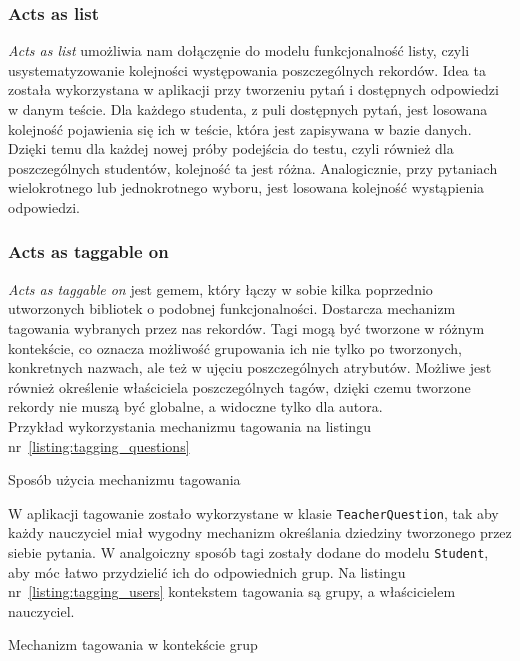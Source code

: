 \documentclass[a4paper,12pt]{article}
\begin{document}
\subsubsection{Acts as list}
\emph{Acts as list} umożliwia nam dołączęnie do modelu funkcjonalność listy, czyli
usystematyzowanie kolejności występowania poszczególnych rekordów. Idea ta została
wykorzystana w aplikacji przy tworzeniu pytań i dostępnych odpowiedzi w danym teście.
Dla każdego studenta, z puli dostępnych pytań, jest losowana kolejność pojawienia się ich w
teście, która jest zapisywana w bazie danych. Dzięki temu dla każdej nowej próby podejścia
do testu, czyli również dla poszczególnych studentów, kolejność ta jest różna.
Analogicznie, przy pytaniach wielokrotnego lub jednokrotnego wyboru, jest losowana
kolejność wystąpienia odpowiedzi.

\subsubsection{Acts as taggable on}
\emph{Acts as taggable on} jest gemem, który łączy w sobie kilka poprzednio utworzonych
bibliotek o podobnej funkcjonalności. Dostarcza mechanizm tagowania wybranych przez
nas rekordów. Tagi mogą być tworzone w różnym kontekście, co oznacza możliwość grupowania
ich nie tylko po tworzonych, konkretnych nazwach, ale też w ujęciu poszczególnych
atrybutów. Możliwe jest również określenie właściciela poszczególnych tagów, dzięki czemu
tworzone rekordy nie muszą być globalne, a widoczne tylko dla autora.\\
Przykład wykorzystania mechanizmu tagowania na listingu nr~\ref{listing:tagging_questions}

\begin{listing}
  
  \caption{Sposób użycia mechanizmu tagowania}
  \label{listing:tagging_questions}
\end{listing}


W aplikacji tagowanie zostało wykorzystane w klasie \texttt{TeacherQuestion}, tak aby
każdy nauczyciel miał wygodny mechanizm określania dziedziny tworzonego przez siebie
pytania. W analgoiczny sposób tagi zostały dodane do modelu \texttt{Student}, aby móc
łatwo przydzielić ich do odpowiednich grup. Na listingu nr~\ref{listing:tagging_users}
kontekstem tagowania są grupy, a właścicielem nauczyciel.

\begin{listing}
  
  \caption{Mechanizm tagowania w kontekście grup}
  \label{listing:tagging_users}
\end{listing}
\end{document}
